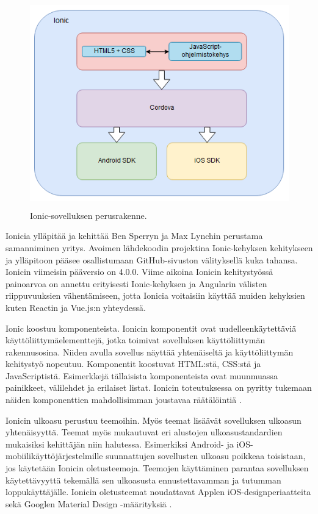 \documentclass[utf8]{gradu3}
\begin{document}
\begin{figure}[h]\centering
  \includegraphics[height=9cm,keepaspectratio]{ionic-structure}
  \caption[Ionic-sovelluksen perusrakenne]
  {Ionic-sovelluksen perusrakenne.}
  \label{fig:ionic-structure}
\end{figure}

Ionicia ylläpitää ja kehittää Ben Sperryn ja Max Lynchin perustama samanniminen yritys. Avoimen lähdekoodin projektina Ionic-kehyksen kehitykseen ja ylläpitoon pääsee osallistumaan GitHub-sivuston välityksellä kuka tahansa. Ionicin viimeisin pääversio on 4.0.0. Viime aikoina Ionicin kehitystyössä painoarvoa on annettu erityisesti Ionic-kehyksen ja Angularin välisten riippuvuuksien vähentämiseen, jotta Ionicia voitaisiin käyttää muiden kehyksien kuten Reactin ja Vue.js:n yhteydessä.

Ionic koostuu komponenteista. Ionicin komponentit ovat uudelleenkäytettäviä käyttöliittymäelementtejä, jotka toimivat sovelluksen käyttöliittymän rakennusosina. Niiden avulla sovellus näyttää yhtenäiseltä ja käyttöliittymän kehitystyö nopeutuu. Komponentit koostuvat HTML:stä, CSS:stä ja JavaScriptistä. Esimerkkejä tällaisista komponenteista ovat muunmuassa painikkeet, välilehdet ja erilaiset listat. Ionicin toteutuksessa on pyritty tukemaan näiden komponenttien mahdollisimman joustavaa räätälöintiä \parencite[]{ionic-documentation}.

Ionicin ulkoasu perustuu teemoihin. Myös teemat lisäävät sovelluksen ulkoasun yhtenäisyyttä. Teemat myös mukautuvat eri alustojen ulkoasustandardien mukaisiksi kehittäjän niin halutessa. Esimerkiksi Android- ja iOS-mobiilikäyttöjärjestelmille suunnattujen sovellusten ulkoasu poikkeaa toisistaan, jos käytetään Ionicin oletusteemoja. Teemojen käyttäminen parantaa sovelluksen käytettävyyttä tekemällä sen ulkoasusta ennustettavamman ja tutumman loppukäyttäjälle. Ionicin oletusteemat noudattavat Applen iOS-designperiaatteita \parencite[]{ios-design-guide} sekä Googlen Material Design -määrityksiä \parencite[]{google-material-design}.
\end{document}
